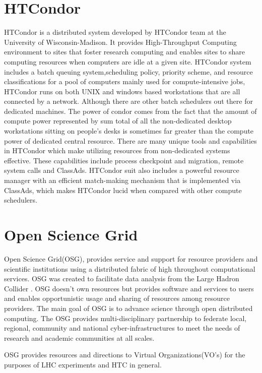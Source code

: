\documentclass[ms,electronic,double]{nuthesis}
\begin{document}
\section{HTCondor} HTCondor is a distributed system developed by HTCondor team at the 
University of Wisconsin-Madison. It provides High-Throughput Computing environment to sites 
that foster research computing and enables sites to share computing resources when 
computers are idle at a given site. HTCondor system includes a batch queuing 
system,scheduling policy, priority scheme, and resource classifications for a pool of 
computers mainly used for compute-intensive jobs, HTCondor runs on both
 UNIX and windows based workstations that are all connected by a network.  
Although there are other batch schedulers out there for dedicated machines. 
The power of condor comes from  the fact that  the amount of compute power 
represented by sum total of all the 
 non-dedicated desktop workstations sitting on people's desks is sometimes far 
 greater than the compute power of dedicated central resource. There are many 
 unique tools and capabilities in HTCondor which make utilizing resources from 
 non-dedicated systems effective. These capabilities include process checkpoint 
 and migration, remote system calls and ClassAds. HTCondor suit also includes a 
 powerful resource manager with an efficient match-making mechanism that is 
 implemented via ClassAds, which makes HTCondor lucid when compared with other 
 compute schedulers.
 
 
\section{Open Science Grid} Open Science Grid(OSG), provides service and support 
for resource providers and scientific institutions using a distributed fabric of 
high throughout computational services. OSG was created to facilitate data analysis from the 
Large Hadron Collider . OSG doesn't own resources but provides software and services to 
users and enables opportunistic usage and sharing of resources among resource providers.
The main goal of OSG is to advance science through open distributed computing. 
The OSG provides multi-disciplinary partnership to federate local, regional, community and 
national cyber-infrastructures to meet the needs of research and academic communities at all scales.

OSG provides resources and directions to Virtual Organizations(VO's) for the purposes of LHC experiments
and HTC in general. \\
\end{document}
